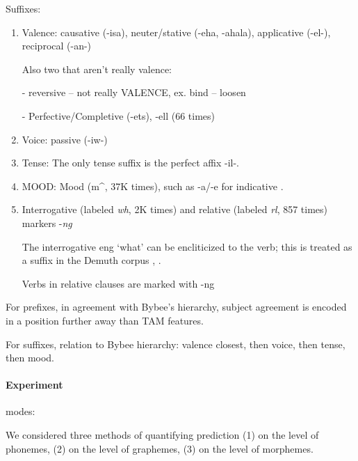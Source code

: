     Suffixes:
    
    \begin{enumerate}
    \item Valence: causative (-isa),  neuter/stative (-eha, -ahala), applicative (-el-), reciprocal (-an-)
    
    
    Also two that aren't really valence:
    
    - reversive \cite[]{doke1967textbook} -- not really VALENCE, ex. bind -- loosen
    
    -  Perfective/Completive (-ets), -ell (66 times) \cite[]{doke1967textbook}
    

    \item Voice: passive (-iw-)
    
    
    \item Tense: The only tense suffix is the perfect affix -il-.

     
    \item MOOD: Mood (m\^{}, 37K times), such as -a/-e for indicative \citep{demuth1992acquisition}.
    

    \item Interrogative (labeled \textit{wh}, 2K times) and relative (labeled \textit{rl}, 857 times) markers -\textit{ng}
    
    The interrogative eng `what' can be encliticized to the verb; this is treated as a suffix in the Demuth corpus \cite[p. 168]{guma1971handbook}, \cite[, 320]{doke1967textbook}.
    
    Verbs in relative clauses are marked with -ng \cite[, 793]{doke1967textbook}

\end{enumerate}



For prefixes, in agreement with Bybee's hierarchy, subject agreement is encoded in a position further away than TAM features.

For suffixes,
relation to Bybee hierarchy: valence closest, then voice, then tense, then mood.




\paragraph{Experiment}

modes:

We considered three methods of quantifying prediction
(1) on the level of phonemes, (2) on the level of graphemes, (3) on the level of morphemes.

